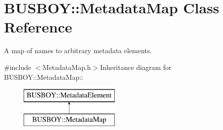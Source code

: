 \hypertarget{classBUSBOY_1_1MetadataMap}{
\section{BUSBOY::MetadataMap Class Reference}
\label{classBUSBOY_1_1MetadataMap}
}


A map of names to arbitrary metadata elements.  


{\ttfamily \#include $<$MetadataMap.h$>$}Inheritance diagram for BUSBOY::MetadataMap::\begin{figure}[H]
\begin{center}
\leavevmode
\includegraphics[height=2cm]{classBUSBOY_1_1MetadataMap}
\end{center}
\end{figure}
